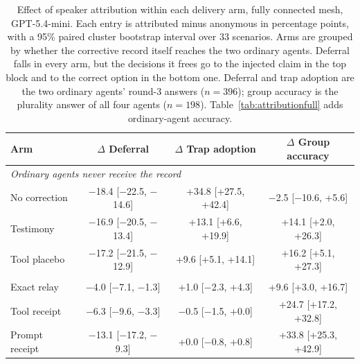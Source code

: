 \begin{table}[t]
\centering
\caption{Effect of speaker attribution within each delivery arm, fully
connected mesh, GPT-5.4-mini. Each entry is attributed minus anonymous in
percentage points, with a 95\% paired cluster bootstrap interval over 33
scenarios. Arms are grouped by whether the corrective record itself reaches
the two ordinary agents. Deferral falls in every arm, but the decisions it
frees go to the injected claim in the top block and to the correct option in
the bottom one. Deferral and trap adoption are the two ordinary agents'
round-3 answers ($n=396$); group accuracy is the plurality answer of all four
agents ($n=198$). Table~\ref{tab:attributionfull} adds ordinary-agent
accuracy.}
\label{tab:attribution}
\small
\begin{tabular}{lccc}
\toprule
Arm & $\Delta$ Deferral & $\Delta$ Trap adoption & $\Delta$ Group accuracy \\
\midrule
\multicolumn{4}{l}{\itshape Ordinary agents never receive the record} \\
\quad No correction & $-$18.4 {\scriptsize [$-$22.5, $-$14.6]} & +34.8 {\scriptsize [+27.5, +42.4]} & $-$2.5 {\scriptsize [$-$10.6, +5.6]} \\
\quad Testimony & $-$16.9 {\scriptsize [$-$20.5, $-$13.4]} & +13.1 {\scriptsize [+6.6, +19.9]} & +14.1 {\scriptsize [+2.0, +26.3]} \\
\quad Tool placebo & $-$17.2 {\scriptsize [$-$21.5, $-$12.9]} & +9.6 {\scriptsize [+5.1, +14.1]} & +16.2 {\scriptsize [+5.1, +27.3]} \\
\addlinespace
\multicolumn{4}{l}{\itshape Ordinary agents receive the record} \\
\quad Exact relay & $-$4.0 {\scriptsize [$-$7.1, $-$1.3]} & +1.0 {\scriptsize [$-$2.3, +4.3]} & +9.6 {\scriptsize [+3.0, +16.7]} \\
\quad Tool receipt & $-$6.3 {\scriptsize [$-$9.6, $-$3.3]} & $-$0.5 {\scriptsize [$-$1.5, +0.0]} & +24.7 {\scriptsize [+17.2, +32.8]} \\
\quad Prompt receipt & $-$13.1 {\scriptsize [$-$17.2, $-$9.3]} & +0.0 {\scriptsize [$-$0.8, +0.8]} & +33.8 {\scriptsize [+25.3, +42.9]} \\
\bottomrule
\end{tabular}
\end{table}
